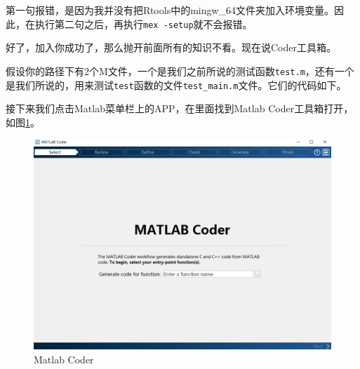 \documentclass[]{ctexbook}
\newenvironment{Shaded}{\begin{snugshade}}{\end{snugshade}}
\newcommand{\FloatTok}[1]{\textcolor[rgb]{0.00,0.00,0.81}{#1}}
\newcommand{\CommentTok}[1]{\textcolor[rgb]{0.56,0.35,0.01}{\textit{#1}}}
\newcommand{\NormalTok}[1]{#1}
\begin{document}
第一句报错，是因为我并没有把Rtools中的mingw\_64文件夹加入环境变量。因此，在执行第二句之后，再执行\texttt{mex\ -setup}就不会报错。

好了，加入你成功了，那么抛开前面所有的知识不看。现在说Coder工具箱。

假设你的路径下有2个M文件，一个是我们之前所说的测试函数\texttt{test.m}，还有一个是我们所说的，用来测试\texttt{test}函数的文件\texttt{test\_main.m}文件。它们的代码如下。

\begin{Shaded}
\end{Shaded}

\begin{Shaded}
\end{Shaded}

接下来我们点击Matlab菜单栏上的APP，在里面找到Matlab
Coder工具箱打开，如图\ref{fig:coder1}。

\begin{figure}

{\centering \includegraphics[width=0.95\linewidth]{img/coder1} 

}

\caption{Matlab Coder}\label{fig:coder1}
\end{figure}
\end{document}
